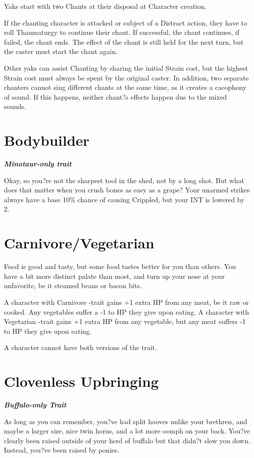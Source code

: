\documentclass[11pt,a4paper,twocolumn]{book}
\begin{document}
	Yaks start with two Chants at their disposal at Character creation.
	
	If the chanting character is attacked or subject of a Distract action, they have to roll Thaumaturgy to continue their chant. If successful, the chant continues, if failed, the chant ends. The effect of the chant is still held for the next turn, but the caster must start the chant again.
	
	Other yaks can assist Chanting by sharing the initial Strain cost, but the highest Strain cost must always be spent by the original caster. In addition, two separate chanters cannot sing different chants at the same time, as it creates a cacophony of sound. If this happens, neither chant?s effects happen due to the mixed sounds.
	
	\section*{Bodybuilder}	
	\emph{\textbf{Minotaur-only trait}}
	
	Okay, so you?re not the sharpest tool in the shed, not by a long shot. But what does that matter when you crush bones as easy as a grape? Your unarmed strikes always have a base 10\% chance of causing Crippled, but your INT is lowered by 2.
	
	\section*{Carnivore/Vegetarian}
	
	Food is good and tasty, but some food tastes better for you than others. You have a bit more distinct palate than most, and turn up your nose at your unfavorite, be it steamed beans or bacon bits.
	
	A character with Carnivore -trait gains +1 extra HP from any meat, be it raw or cooked. Any vegetables suffer a -1 to HP they give upon eating. A character with Vegetarian -trait gains +1 extra HP from any vegetable, but any meat suffers -1 to HP they give upon eating.
	
	A character cannot have both versions of the trait.
	
	\section*{Clovenless Upbringing}
	\emph{\textbf{Buffalo-only Trait}}
	
	As long as you can remember, you?ve had split hooves unlike your brethren, and maybe a larger size, nice twin horns, and a lot more oomph on your back. You?ve clearly been raised outside of your herd of buffalo but that didn?t slow you down. Instead, you?ve been raised by ponies.
	
\end{document}
